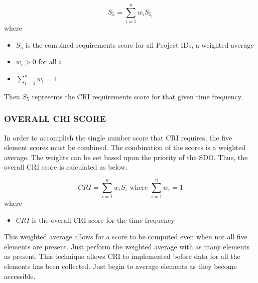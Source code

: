 \documentclass[SDSUThesis.tex]{subfiles}
\begin{document}
                \[
                    S_{5} = \sum\limits^n_{i=1} w_i S_{5_i} 
                \]
                where
                \begin{itemize}
                    \item $S_5$ is the combined requirements score for all Project IDs, 
                    a weighted average
                    \item $w_i > 0$ for all $i$
                    \item $\sum\limits^n_{i=1} w_i = 1$
                \end{itemize}
                
                Then $S_5$ represents the CRI requirements score for that given time 
                frequency.
                
        \subsubsection{OVERALL CRI SCORE}
            In order to accomplish the single number score that CRI requires,
            the five element scores must be combined. The combination of the scores
            is a weighted average.  The weights can be set based upon the 
            priority of the SDO.  Thus, the overall CRI score is calculated as below.
            
            \[
                CRI =\sum\limits^n_{i=1} w_i S_i 
                    \text{ where } \sum\limits^n_{i=1} w_i = 1
            \]
            where
            \begin{itemize}
                \item $CRI$ is the overall CRI score for the time frequency
            \end{itemize}
            
            This weighted average allows for a score to be computed even when not
            all five elements are present. Just perform the weighted average with
            as many elements as present.  This technique allows CRI to implemented
            before data for all the elements has been collected.  Just begin
            to average elements as they become accessible.
\end{document}
